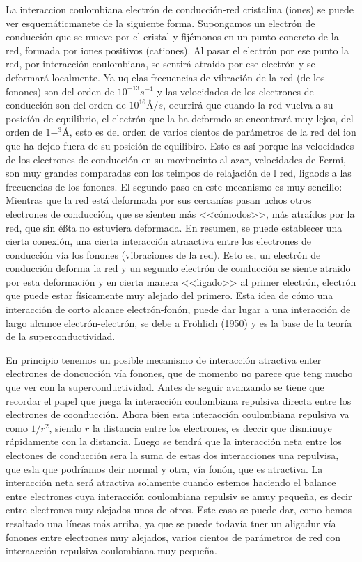 La interaccion coulombiana electrón de conducción-red cristalina (iones) se puede ver esquemáticmanete de la siguiente forma. Supongamos un electrón de conducción que se mueve por el cristal y fijémonos en un punto concreto de la red, formada por iones positivos (cationes). Al pasar el electrón por ese punto la red, por interacción coulombiana, se sentirá atraido por ese electrón y se deformará localmente. Ya uq elas frecuencias de vibración de la red (de los fonones) son del orden de $10^{-13} s^{-1}$ y las velocidades de los electrones de conducción son del orden de $10^{16} Å/s$, ocurrirá que cuando la red vuelva a su posicíón de equilibrio, el electrón que la ha deformdo se encontrará muy lejos, del orden de $1-^3 Å$, esto es del orden de varios cientos de parámetros de la red del ion que ha dejdo fuera de su posición de equilibiro. Esto es así porque las velocidades de los electrones de conducción en su movimeinto al azar, velocidades de Fermi, son muy grandes comparadas con los teimpos de relajación de l red, ligaods a las frecuencias de los fonones. El segundo paso en este mecanismo es muy sencillo: Mientras que la red está deformada por sus cercanías pasan uchos otros electrones de conducción, que se sienten más <<cómodos>>, más atraídos por la red, que sin éßta no estuviera deformada. En resumen, se puede establecer una cierta conexión, una cierta interacción atraactiva entre los electrones de conducción vía los fonones (vibraciones de la red). Esto es, un electrón de conducción deforma la red y un segundo electrón de conducción se siente atraido por esta deformación y en cierta manera <<ligado>> al primer electrón, electrón que puede estar físicamente muy alejado del primero. Esta idea de cómo una interacción de corto alcance electrón-fonón, puede dar lugar a una interacción de largo alcance electrón-electrón, se debe a Fröhlich (1950) y es la base de la teoría de la superconductividad.

En principio tenemos un posible mecanismo de interacción atractiva enter electrones de doncucción vía fonones, que de momento no parece que teng mucho que ver con la superconductividad. Antes de seguir avanzando se tiene que recordar el papel que juega la interacción coulombiana repulsiva directa entre los electrones de coonducción. Ahora bien esta interacción coulombiana repulsiva va como $1/r^2$, siendo $r$ la distancia entre los electrones, es deccir que disminuye rápidamente con la distancia. Luego se tendrá que la interacción neta entre los electones de conducción sera la suma de estas dos interacciones una repulvisa, que esla que podríamos deir normal y otra, vía fonón, que es atractiva. La interacción neta será atractiva solamente cuando estemos haciendo el balance entre electrones cuya interacción coulombiana repulsiv se amuy pequeña, es decir entre electrones muy alejados unos de otros. Este caso se puede dar, como hemos resaltado una líneas más arriba, ya que se puede todavía tner un aligadur vía fonones entre electrones muy alejados, varios cientos de parámetros de red con interaacción repulsiva coulombiana muy pequeña.

